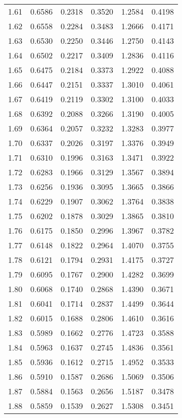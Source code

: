 \documentclass{article}
\begin{document}
\begin{longtable}{cccccc}
1.61 & 0.6586 & 0.2318 & 0.3520 & 1.2584 & 0.4198 \\
1.62 & 0.6558 & 0.2284 & 0.3483 & 1.2666 & 0.4171 \\
1.63 & 0.6530 & 0.2250 & 0.3446 & 1.2750 & 0.4143 \\
1.64 & 0.6502 & 0.2217 & 0.3409 & 1.2836 & 0.4116 \\
1.65 & 0.6475 & 0.2184 & 0.3373 & 1.2922 & 0.4088 \\
1.66 & 0.6447 & 0.2151 & 0.3337 & 1.3010 & 0.4061 \\
1.67 & 0.6419 & 0.2119 & 0.3302 & 1.3100 & 0.4033 \\
1.68 & 0.6392 & 0.2088 & 0.3266 & 1.3190 & 0.4005 \\
1.69 & 0.6364 & 0.2057 & 0.3232 & 1.3283 & 0.3977 \\
1.70 & 0.6337 & 0.2026 & 0.3197 & 1.3376 & 0.3949 \\
1.71 & 0.6310 & 0.1996 & 0.3163 & 1.3471 & 0.3922 \\
1.72 & 0.6283 & 0.1966 & 0.3129 & 1.3567 & 0.3894 \\
1.73 & 0.6256 & 0.1936 & 0.3095 & 1.3665 & 0.3866 \\
1.74 & 0.6229 & 0.1907 & 0.3062 & 1.3764 & 0.3838 \\
1.75 & 0.6202 & 0.1878 & 0.3029 & 1.3865 & 0.3810 \\
1.76 & 0.6175 & 0.1850 & 0.2996 & 1.3967 & 0.3782 \\
1.77 & 0.6148 & 0.1822 & 0.2964 & 1.4070 & 0.3755 \\
1.78 & 0.6121 & 0.1794 & 0.2931 & 1.4175 & 0.3727 \\
1.79 & 0.6095 & 0.1767 & 0.2900 & 1.4282 & 0.3699 \\
1.80 & 0.6068 & 0.1740 & 0.2868 & 1.4390 & 0.3671 \\
1.81 & 0.6041 & 0.1714 & 0.2837 & 1.4499 & 0.3644 \\
1.82 & 0.6015 & 0.1688 & 0.2806 & 1.4610 & 0.3616 \\
1.83 & 0.5989 & 0.1662 & 0.2776 & 1.4723 & 0.3588 \\
1.84 & 0.5963 & 0.1637 & 0.2745 & 1.4836 & 0.3561 \\
1.85 & 0.5936 & 0.1612 & 0.2715 & 1.4952 & 0.3533 \\
1.86 & 0.5910 & 0.1587 & 0.2686 & 1.5069 & 0.3506 \\
1.87 & 0.5884 & 0.1563 & 0.2656 & 1.5187 & 0.3478 \\
1.88 & 0.5859 & 0.1539 & 0.2627 & 1.5308 & 0.3451 \\

\end{longtable}
\end{document}
